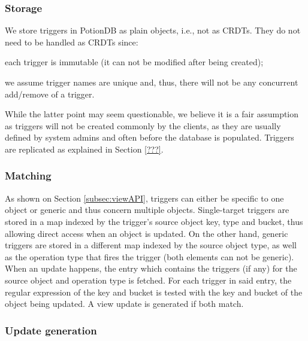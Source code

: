 \documentclass{vldb}
\newcommand{\grumbler}[2]{{\color{red}{\bf #1:} #2}}
\renewcommand{\grumbler}[2]{}
\newcommand{\andre}[1]{\grumbler{andre}{#1}}
\begin{document}
\subsubsection{Storage}

\andre{We likely need to refer in the replication section how we replicate triggers? }

We store triggers in PotionDB as plain objects, i.e., not as CRDTs.
They do not need to be handled as CRDTs since:
\begin{enumerate*}[label=(\roman*)]
	\item each trigger is immutable (it can not be modified after being created);
	\item we assume trigger names are unique and, thus, there will not be any concurrent add/remove of a trigger.
\end{enumerate*}
While the latter point may seem questionable, we believe it is a fair assumption as triggers will not be created commonly by the clients, as they are usually defined by system admins and often before the database is populated.
Triggers are replicated as explained in Section \ref{???}.

\subsubsection{Matching}

As shown on Section \ref{subsec:viewAPI}, triggers can either be specific to one object or generic and thus concern multiple objects.
Single-target triggers are stored in a map indexed by the trigger's source object key, type and bucket, thus allowing direct access when an object is updated.
On the other hand, generic triggers are stored in a different map indexed by the source object type, as well as the operation type that fires the trigger (both elements can not be generic).
When an update happens, the entry which contains the triggers (if any) for the source object and operation type is fetched.
For each trigger in said entry, the regular expression of the key and bucket is tested with the key and bucket of the object being updated.
A view update is generated if both match.

\subsubsection{Update generation}

\andre{two questions: a) should the part of clients applying the triggers be in its own subsection; b) should I mention that in the future we intend for servers to apply the triggers?}
\end{document}
